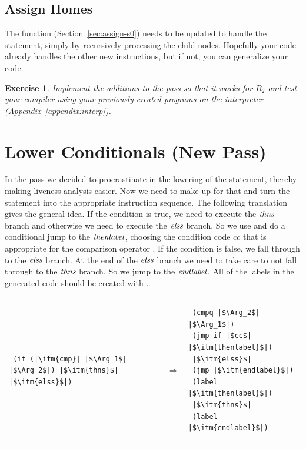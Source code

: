 \documentclass[11pt]{book}
\newtheorem{exercise}[theorem]{Exercise}
\begin{document}
\subsection{Assign Homes}
\label{sec:assign-homes-r2}

The  function (Section~\ref{sec:assign-s0}) needs
to be updated to handle the  statement, simply by recursively
processing the child nodes.  Hopefully your code already handles the
other new instructions, but if not, you can generalize your code.

\begin{exercise}\normalfont
Implement the additions to the  pass so that
it works for $R_2$ and test your compiler using your previously
created programs on the  interpreter
(Appendix~\ref{appendix:interp}).
\end{exercise}


\section{Lower Conditionals (New Pass)}
\label{sec:lower-conditionals}

In the  pass we decided to procrastinate in
the lowering of the  statement, thereby making liveness
analysis easier. Now we need to make up for that and turn the 
statement into the appropriate instruction sequence.  The following
translation gives the general idea. If the condition is true, we need
to execute the $\mathit{thns}$ branch and otherwise we need to execute
the $\mathit{elss}$ branch. So we use  and do a conditional
jump to the $\mathit{thenlabel}$, choosing the condition code $cc$ that
is appropriate for the comparison operator .  If the
condition is false, we fall through to the $\mathit{elss}$ branch. At the
end of the $\mathit{elss}$ branch we need to take care to not fall
through to the $\mathit{thns}$ branch. So we jump to the
$\mathit{endlabel}$. All of the labels in the generated code should be
created with .

\begin{tabular}{lll}
\begin{minipage}{0.4\textwidth}
\begin{lstlisting}
 (if (|\itm{cmp}| |$\Arg_1$| |$\Arg_2$|) |$\itm{thns}$| |$\itm{elss}$|)
\end{lstlisting}
\end{minipage}
&
$\Rightarrow$
&
\begin{minipage}{0.4\textwidth}
\begin{lstlisting}
 (cmpq |$\Arg_2$| |$\Arg_1$|)
 (jmp-if |$cc$| |$\itm{thenlabel}$|)
 |$\itm{elss}$|
 (jmp |$\itm{endlabel}$|)
 (label |$\itm{thenlabel}$|)
 |$\itm{thns}$|
 (label |$\itm{endlabel}$|)
\end{lstlisting}
\end{minipage}
\end{tabular}
\end{document}
